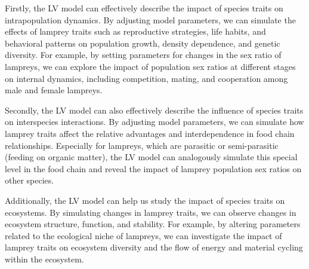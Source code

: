 \documentclass[CTeX = true]{mcmthesis}  %
\begin{document}
Firstly, the LV model can effectively describe the impact of species traits on intrapopulation dynamics. By adjusting model parameters, we can simulate the effects of lamprey traits such as reproductive strategies, life habits, and behavioral patterns on population growth, density dependence, and genetic diversity. For example, by setting parameters for changes in the sex ratio of lampreys, we can explore the impact of population sex ratios at different stages on internal dynamics, including competition, mating, and cooperation among male and female lampreys.

Secondly, the LV model can also effectively describe the influence of species traits on interspecies interactions. By adjusting model parameters, we can simulate how lamprey traits affect the relative advantages and interdependence in food chain relationships. Especially for lampreys, which are parasitic or semi-parasitic (feeding on organic matter), the LV model can analogously simulate this special level in the food chain and reveal the impact of lamprey population sex ratios on other species.

Additionally, the LV model can help us study the impact of species traits on ecosystems. By simulating changes in lamprey traits, we can observe changes in ecosystem structure, function, and stability. For example, by altering parameters related to the ecological niche of lampreys, we can investigate the impact of lamprey traits on ecosystem diversity and the flow of energy and material cycling within the ecosystem.

\end{document}
